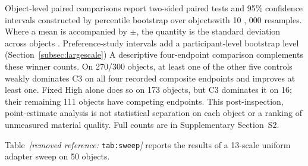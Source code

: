 \documentclass[times,twocolumn,final]{elsarticle}
\providecommand{\DIFadd}[1]{{\protect\color{blue} \sf #1}} %
\providecommand{\DIFdel}[1]{{\protect\color{red} \scriptsize #1}} %
\providecommand{\DIFaddbegin}{} %
\providecommand{\DIFaddend}{} %
\providecommand{\DIFdelbegin}{} %
\providecommand{\DIFdelend}{} %
\begin{document}
\DIFdelbegin %
\DIFdel{Object-level paired comparisons report two-sided paired tests and 95\% confidence intervals constructed by percentile bootstrap over objectswith 10}%
\DIFdel{, }%
\DIFdel{000 resamples. Where a mean is accompanied by $\pm$, the quantity is the standard deviation across objects . Preference-study intervals add a participant-level bootstrap level (Section~\ref{subsec:largescale})}\DIFdelend \DIFaddbegin \DIFadd{A descriptive four-endpoint comparison complements these winner counts. On 270/300 objects, at least one of the other five controls weakly dominates C3 on all four recorded composite endpoints and improves at least one. Fixed High alone does so on 173 objects, but C3 dominates it on 16; their remaining 111 objects have competing endpoints. This post-inspection, point-estimate analysis is not statistical separation on each object or a ranking of unmeasured material quality. Full counts are in Supplementary Section~S2}\DIFaddend .

\DIFdelbegin %

\DIFdel{Table~\textit{[removed reference: }\texttt{tab:sweep}\textit{]} reports the results of a 13-scale uniform adapter sweep on 50 objects. }%
\end{document}
